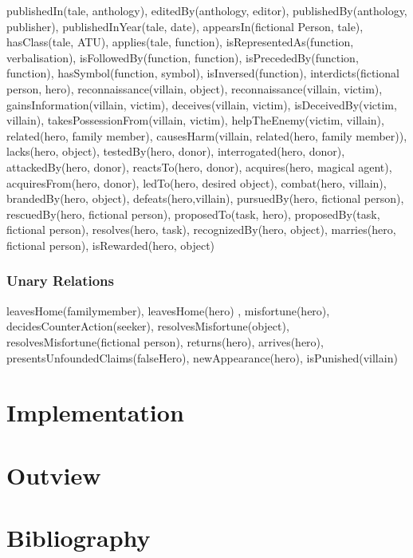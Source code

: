 \documentclass[10pt,a4paper]{article}
\begin{document}
publishedIn(tale, anthology), editedBy(anthology, editor), publishedBy(anthology, publisher), publishedInYear(tale, date), appearsIn(fictional Person, tale), hasClass(tale, ATU), applies(tale, function), isRepresentedAs(function, verbalisation), isFollowedBy(function, function), isPrecededBy(function, function), hasSymbol(function, symbol), isInversed(function), interdicts(fictional person, hero), reconnaissance(villain, object), reconnaissance(villain, victim), gainsInformation(villain, victim), deceives(villain, victim), isDeceivedBy(victim, villain), takesPossessionFrom(villain, victim), helpTheEnemy(victim, villain), related(hero, family member), causesHarm(villain, related(hero, family member)), lacks(hero, object), testedBy(hero, donor), interrogated(hero, donor), attackedBy(hero, donor), reactsTo(hero, donor), acquires(hero, magical agent), acquiresFrom(hero, donor), ledTo(hero, desired object), combat(hero, villain), brandedBy(hero, object), defeats(hero,villain), pursuedBy(hero, fictional person), rescuedBy(hero, fictional person), proposedTo(task, hero), proposedBy(task, fictional person), resolves(hero, task), recognizedBy(hero, object), marries(hero, fictional person), isRewarded(hero, object)

 	\subsubsection{Unary Relations} 
 	leavesHome(familymember), leavesHome(hero) , misfortune(hero), decidesCounterAction(seeker), resolvesMisfortune(object), resolvesMisfortune(fictional person), returns(hero), arrives(hero), presentsUnfoundedClaims(falseHero), newAppearance(hero), isPunished(villain)


\normalsize

\section{Implementation}
\section{Outview}
\section{Bibliography}
 

\end{document}
